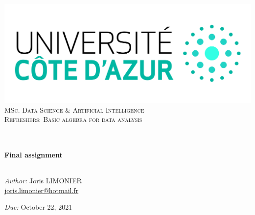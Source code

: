 \begin{titlepage}
	\begin{center}
		\includegraphics[width=\textwidth]{images/logo_uca.jpeg}\\[0.1cm]
		\vspace{1.5cm}
		\textsc{\Large MSc. Data Science \& Artificial Intelligence}\\[1.2cm]
		\textsc{\Large Refreshers: Basic algebra for data analysis}\\[1.2cm]
		\\
		\vspace{1cm}
		
		\HRule \\[0.6cm]
		{\huge \bfseries Final assignment}\\[0.4cm]
		\HRule \\[1.5cm]
		\vspace{1cm}
		
		\vfill
		\large
		\emph{Author:} Joris LIMONIER\\
		\vspace{.2cm}
		\href{mailto:joris.limonier@hotmail.fr}{joris.limonier@hotmail.fr}\\
		\vspace{.2cm}


		\emph{Due:} {\large October 22, 2021}
	\end{center}
\end{titlepage}



